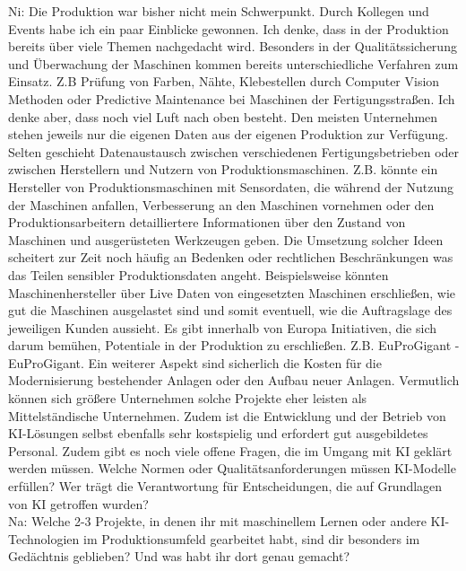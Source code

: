 \documentclass[a4paper,12pt, german]{report}
\begin{document}
Ni: Die Produktion war bisher nicht mein Schwerpunkt. Durch Kollegen und Events habe ich ein paar Einblicke gewonnen.
Ich denke, dass in der Produktion bereits über viele Themen nachgedacht wird. Besonders in der Qualitätssicherung und Überwachung der Maschinen kommen bereits unterschiedliche Verfahren zum Einsatz. Z.B Prüfung von Farben, Nähte, Klebestellen durch Computer Vision Methoden oder Predictive Maintenance bei Maschinen der Fertigungsstraßen.\newline
Ich denke aber, dass noch viel Luft nach oben besteht. Den meisten Unternehmen stehen jeweils nur die eigenen Daten aus der eigenen Produktion zur Verfügung. Selten geschieht Datenaustausch zwischen verschiedenen Fertigungsbetrieben oder zwischen Herstellern und Nutzern von Produktionsmaschinen. Z.B. könnte ein Hersteller von Produktionsmaschinen mit Sensordaten, die während der Nutzung der Maschinen anfallen, Verbesserung an den Maschinen vornehmen oder den Produktionsarbeitern detailliertere Informationen über den Zustand von Maschinen und ausgerüsteten Werkzeugen geben.
Die Umsetzung solcher Ideen scheitert zur Zeit noch häufig an Bedenken oder rechtlichen Beschränkungen was das Teilen sensibler Produktionsdaten angeht. Beispielsweise könnten Maschinenhersteller über Live Daten von eingesetzten Maschinen erschließen, wie gut die Maschinen ausgelastet sind und somit eventuell, wie die Auftragslage des jeweiligen Kunden aussieht.\newline
Es gibt innerhalb von Europa Initiativen, die sich darum bemühen, Potentiale in der Produktion zu erschließen. Z.B. EuProGigant - EuProGigant.
Ein weiterer Aspekt sind sicherlich die Kosten für die Modernisierung bestehender Anlagen oder den Aufbau neuer Anlagen. Vermutlich können sich größere Unternehmen solche Projekte eher leisten als Mittelständische Unternehmen. Zudem ist die Entwicklung und der Betrieb von KI-Lösungen selbst ebenfalls sehr kostspielig und erfordert gut ausgebildetes Personal. Zudem gibt es noch viele offene Fragen, die im Umgang mit KI geklärt werden müssen. Welche Normen oder Qualitätsanforderungen müssen KI-Modelle erfüllen? Wer trägt die Verantwortung für Entscheidungen, die auf Grundlagen von KI getroffen wurden? 
\\

Na: Welche 2-3 Projekte, in denen ihr mit maschinellem Lernen oder andere KI-Technologien im Produktionsumfeld gearbeitet habt, sind dir besonders im Gedächtnis geblieben? Und was habt ihr dort genau gemacht?
\\
\end{document}
